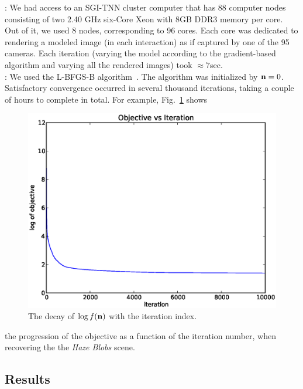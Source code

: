 \documentclass[10pt,twocolumn,letterpaper]{article}
\begin{document}
: We had access to an SGI-TNN cluster computer that has 88 computer nodes consisting of two 2.40 GHz six-Core Xeon with 8GB
DDR3 memory per core. Out of it, we used 8 nodes, corresponding to 96 cores. Each core was dedicated to rendering a modeled image (in each interaction) as if captured by one of the 95 cameras. Each iteration (varying the model according to the gradient-based algorithm and varying all the rendered images) took $\approx 7$sec.\\

: We used the L-BFGS-B algorithm~\cite{BFGS}. The algorithm was initialized by ${\bf n}=0$. Satisfactory convergence occurred in several thousand iterations, taking a couple of hours to complete in total. For example, Fig.~\ref{fig:objective} shows
\begin{figure}[t]
  \centering
  \includegraphics[width=\columnwidth]{images/objective.eps}
  \caption{\small The decay of $\log f({\bf n})$ with the iteration index.}
  \label{fig:objective}
\end{figure}
the progression of the objective as a function of the iteration number, when recovering the the {\em Haze Blobs} scene.


\subsection{Results}
\label{sec:optimization-results}
\end{document}
